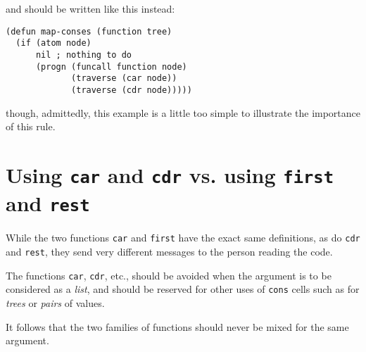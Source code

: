 and should be written like this instead:

\begin{verbatim}
(defun map-conses (function tree)
  (if (atom node)
      nil ; nothing to do
      (progn (funcall function node)
             (traverse (car node))
             (traverse (cdr node)))))
\end{verbatim}

though, admittedly, this example is a little too simple to illustrate
the importance of this rule.

\section{Using \texttt{car} and \texttt{cdr} vs. using \texttt{first}
  and \texttt{rest}}

While the two functions \texttt{car} and \texttt{first} have the exact
same definitions, as do \texttt{cdr} and \texttt{rest}, they send very
different messages to the person reading the code.

The functions \texttt{car}, \texttt{cdr}, etc., should be avoided when
the argument is to be considered as a \emph{list}, and should be
reserved for other uses of \texttt{cons} cells such as for
\emph{trees} or \emph{pairs} of values.

It follows that the two families of functions should never be mixed
for the same argument.
